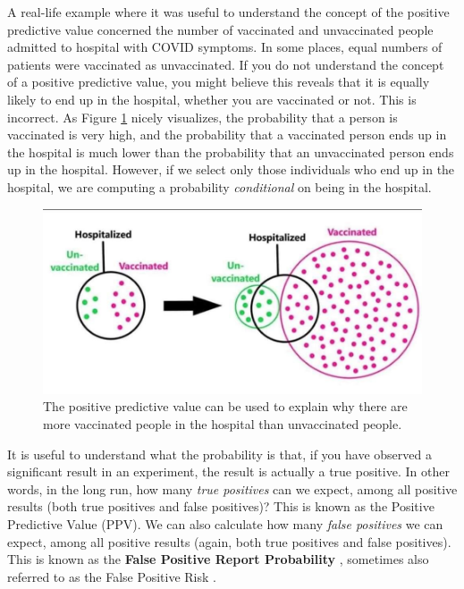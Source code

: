 \documentclass[
  oneside]{krantz}
\begin{document}
A real-life example where it was useful to understand the concept of the positive predictive value concerned the number of vaccinated and unvaccinated people admitted to hospital with COVID symptoms. In some places, equal numbers of patients were vaccinated as unvaccinated. If you do not understand the concept of a positive predictive value, you might believe this reveals that it is equally likely to end up in the hospital, whether you are vaccinated or not. This is incorrect. As Figure \ref{fig:ppvhospital} nicely visualizes, the probability that a person is vaccinated is very high, and the probability that a vaccinated person ends up in the hospital is much lower than the probability that an unvaccinated person ends up in the hospital. However, if we select only those individuals who end up in the hospital, we are computing a probability \emph{conditional} on being in the hospital.



\begin{figure}

{\centering \includegraphics[width=1\linewidth]{images/hospitalvaccinated} 

}

\caption{The positive predictive value can be used to explain why there are more vaccinated people in the hospital than unvaccinated people.}\label{fig:ppvhospital}
\end{figure}

It is useful to understand what the probability is that, if you have observed a significant result in an experiment, the result is actually a true positive. In other words, in the long run, how many \emph{true positives} can we expect, among all positive results (both true positives and false positives)? This is known as the Positive Predictive Value (PPV). We can also calculate how many \emph{false positives} we can expect, among all positive results (again, both true positives and false positives). This is known as the \textbf{False Positive Report Probability} \citep{wacholder_assessing_2004}, sometimes also referred to as the False Positive Risk \citep{colquhoun_false_2019}.
\end{document}

